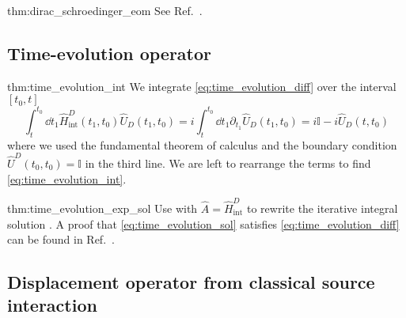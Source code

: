 \begin{delayedproof}{thm:dirac_schroedinger_eom}
	See Ref.~\cite[p.~214]{Greiner2013}.
\end{delayedproof}

\subsection{Time-evolution operator}

\begin{delayedproof}{thm:time_evolution_int}
	We integrate \cref{eq:time_evolution_diff} over the interval $[t_0,t]$
	\begin{equation}
		\int_t^{t_0}\dd{t_1}
		\hat{H}_\text{int}^D(t_1,t_0)
		\hat{U}_D(t_1,t_0)
		=
		i\int_t^{t_0}\dd{t_1}
		\partial_{t_1}
		\hat{U}_D(t_1,t_0)
		=
		i\mathbb{I}
		-
		i\hat{U}_D(t,t_0)
	\end{equation}
	where we used the fundamental theorem of calculus and the boundary condition $\hat{U}^D(t_0,t_0)=\mathbb{I}$ in the third line.
	We are left to rearrange the terms to find \cref{eq:time_evolution_int}.
\end{delayedproof}

\begin{delayedproof}{thm:time_evolution_exp_sol}
	Use  with $\hat{A}=\hat{H}_\text{int}^D$ to rewrite the iterative integral solution .
	A proof that \cref{eq:time_evolution_sol} satisfies \cref{eq:time_evolution_diff} can be found in Ref.~\cite[p.~219]{Greiner2013}.
\end{delayedproof}

\subsection{Displacement operator from classical source interaction}

